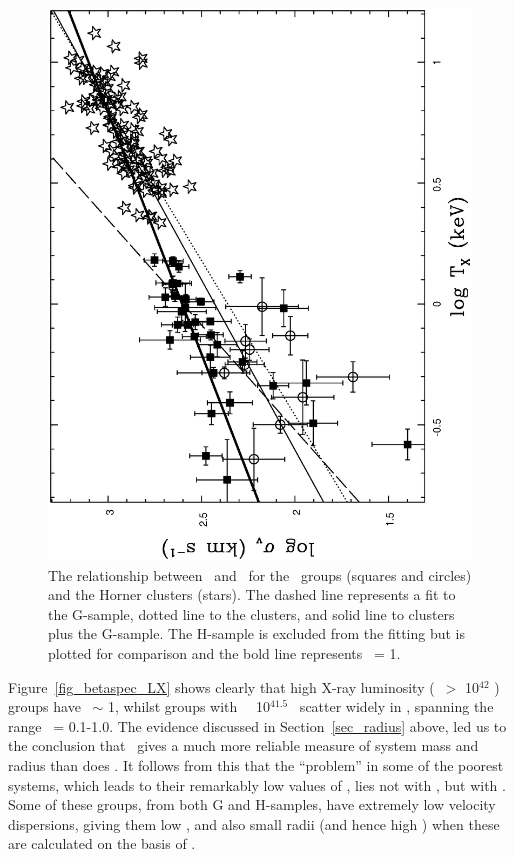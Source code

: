 \documentclass[usenatbib]{mn2e}
\begin{document}
\begin{figure}

  \includegraphics[height=\linewidth,angle=270]{fig_16.ps}
  \caption{The relationship between \sigmav\ and \TX\ for the \GEMS\ groups
           (squares and circles) and the Horner clusters (stars). The dashed line
           represents a fit to the G-sample, dotted line to the clusters, and
           solid line to clusters plus the G-sample. The H-sample is excluded
           from the fitting but is plotted for comparison and the bold line
           represents \betaspec\ = 1.}
  \label{fig_sigma_TX_comp}

\end{figure}

Figure~\ref{fig_betaspec_LX} shows clearly that high X-ray luminosity (\LX\ $>$
10$^{42}$ \ergps) groups have \betaspec\ $\sim$ 1, whilst groups with \LX\
\ltsim\ 10$^{41.5}$ \ergps\ scatter widely in \betaspec, spanning the range
\betaspec\ = 0.1-1.0. The evidence discussed in Section~\ref{sec_radius} above,
led us to the conclusion that \TX\ gives a much more reliable measure of system
mass and radius than does \sigmav.  It follows from this that the ``problem'' in
some of the poorest systems, which leads to their remarkably low values of
\betaspec, lies not with \TX, but with \sigmav. Some of these groups, from both G
and H-samples, have extremely low velocity dispersions, giving them low
\betaspec, and also small radii (and hence high \dengal) when these are
calculated on the basis of \sigmav.
\end{document}
